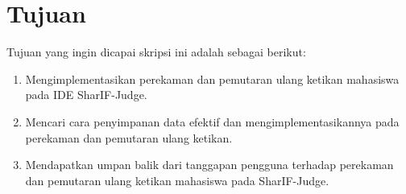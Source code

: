 \documentclass[a4paper,twoside]{article}
\begin{document}
\section{Tujuan}

Tujuan yang ingin dicapai skripsi ini adalah sebagai berikut:
\begin{enumerate}
	\item Mengimplementasikan perekaman dan pemutaran ulang ketikan mahasiswa pada IDE SharIF-Judge.
	\item Mencari cara penyimpanan data efektif dan mengimplementasikannya pada perekaman dan pemutaran ulang ketikan.
	\item Mendapatkan umpan balik dari tanggapan pengguna terhadap perekaman dan pemutaran ulang ketikan mahasiswa pada SharIF-Judge.
\end{enumerate}
\end{document}

